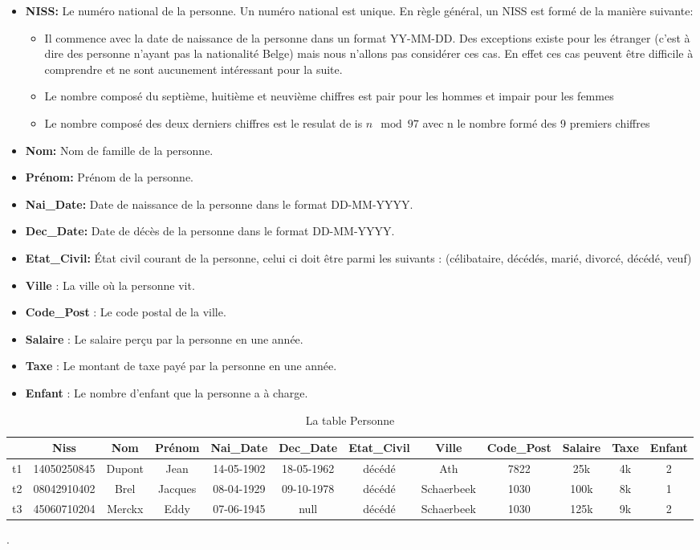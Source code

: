 \documentclass[letterpaper, 12pt]{report}
\theoremstyle{definition}
\begin{document}
\begin{itemize}
\item \textbf{NISS:} Le numéro national de la personne. Un numéro national est unique. En règle général, un NISS est formé de la manière suivante: \cite{bcss}
	\begin{itemize}
	\item Il commence avec la date de naissance de la personne dans un format YY-MM-DD. Des exceptions existe pour les étranger (c'est à dire des personne n'ayant pas la nationalité Belge) mais nous n'allons pas considérer ces cas. En effet ces cas peuvent être difficile à comprendre et ne sont aucunement intéressant pour la suite.
	\item Le nombre composé du septième, huitième et neuvième chiffres est pair pour les hommes et impair pour les femmes
	\item Le nombre composé des deux derniers chiffres est le resulat de is $n \mod 97$ avec n le nombre formé des 9 premiers chiffres
	\end{itemize}
\item \textbf{Nom:} Nom de famille de la personne.
\item \textbf{Prénom:} Prénom de la personne.
\item \textbf{Nai\_Date:} Date de naissance de la personne dans le format DD-MM-YYYY.
\item \textbf{Dec\_Date:} Date de décès de la personne dans le format DD-MM-YYYY.
\item \textbf{Etat\_Civil:} État civil courant de la personne, celui ci doit être parmi les suivants : (célibataire, décédés, marié, divorcé, décédé, veuf)
\item \textbf{Ville} : La ville où la personne vit.
\item \textbf{Code\_Post} : Le code postal de la ville.
\item \textbf{Salaire} : Le salaire perçu par la personne en une année.
\item \textbf{Taxe} : Le montant de taxe payé par la personne en une année.
\item \textbf{Enfant} : Le nombre d'enfant que la personne a à charge.
\end{itemize}

\begin{table}[H]
 \footnotesize	
	\centering
	\hspace*{-2cm}\begin{tabular}{|c|c c c c c c c c c c c|}
	\hline
	    & Niss & Nom & Prénom & Nai\_Date & Dec\_Date & Etat\_Civil & Ville & Code\_Post & Salaire & Taxe & Enfant\\
	\hline
	 t1 & 14050250845 & Dupont & Jean & 14-05-1902 & 18-05-1962 & décédé & Ath & 7822 & 25k & 4k & 2\\
	 t2 & 08042910402 & Brel & Jacques & 08-04-1929 & 09-10-1978 & décédé & Schaerbeek & 1030 & 100k & 8k & 1\\
	 t3 & 45060710204 & Merckx & Eddy & 07-06-1945 & null & décédé & Schaerbeek & 1030 & 125k & 9k & 2\\
	\hline
	 
	 \hline
	\end{tabular}
	\caption{\label{tablePerson} La table Personne}.
\end{table}
\end{document}
